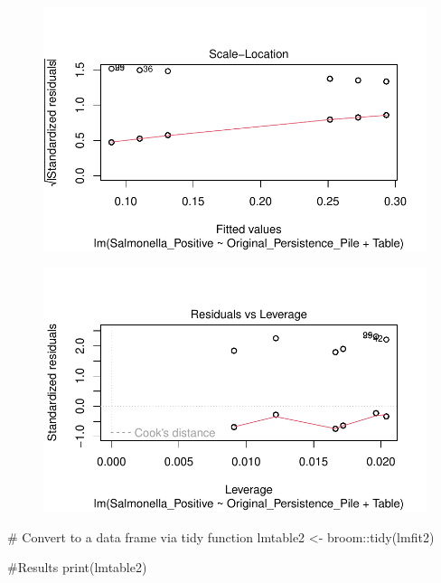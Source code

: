 \documentclass[
  letterpaper,
  DIV=11,
  numbers=noendperiod]{scrartcl}
\newenvironment{Shaded}{}{}
\newcommand{\CommentTok}[1]{\textcolor[rgb]{0.42,0.45,0.49}{#1}}
\newcommand{\FunctionTok}[1]{\textcolor[rgb]{0.44,0.26,0.76}{#1}}
\newcommand{\NormalTok}[1]{\textcolor[rgb]{0.14,0.16,0.18}{#1}}
\newcommand{\OtherTok}[1]{\textcolor[rgb]{0.44,0.26,0.76}{#1}}
\newcommand{\SpecialCharTok}[1]{\textcolor[rgb]{0.00,0.36,0.77}{#1}}
\begin{document}
\begin{figure}[H]

{\centering \includegraphics{Supplementary_Material_files/figure-pdf/unnamed-chunk-3-7.pdf}

}

\end{figure}

\begin{figure}[H]

{\centering \includegraphics{Supplementary_Material_files/figure-pdf/unnamed-chunk-3-8.pdf}

}

\end{figure}

\begin{Shaded}
\begin{Highlighting}[]
\CommentTok{\# Convert to a data frame via tidy function}
\NormalTok{lmtable2 }\OtherTok{\textless{}{-}}\NormalTok{ broom}\SpecialCharTok{::}\FunctionTok{tidy}\NormalTok{(lmfit2)}

\CommentTok{\#Results}
\FunctionTok{print}\NormalTok{(lmtable2)}
\end{Highlighting}
\end{Shaded}
\end{document}
